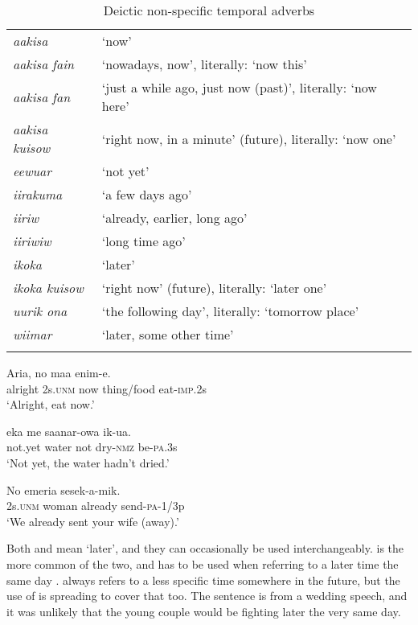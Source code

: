 \begin{table}
\caption{Deictic non-specific temporal adverbs}
\label{tab:3:deicticnonspecifictemporals}

\begin{tabular}{>{\itshape}ll}
\mytoprule
aakisa &`now'\\
aakisa fain &`nowadays, now', literally: `now this'\\
aakisa fan &`just a while ago, just now (past)', literally: `now here'\\
aakisa kuisow &`right now, in a minute' (future), literally: `now one'\\
eewuar &`not yet'\\
iirakuma &`a few days ago'\\
iiriw &`already, earlier, long ago'\\
iiriwiw &`long time ago'\\
ikoka &`later'\\
ikoka kuisow &`right now' (future), literally: `later one'\\
uurik ona &`the following day', literally: `tomorrow place'\\
wiimar &`later, some other time'\\
\mybottomrule 
\end{tabular}

\end{table}

\ea%
\label{ex:3:x473}
\gll Aria, no  maa enim-e. \\
alright 2s.\textsc{unm} now thing/food eat-\textsc{imp}.2s\\
\glt`Alright, eat now.'
\z

\ea%
\label{ex:3:x1215}
\gll {}  eka me saanar-owa ik-ua. \\
not.yet water not dry-\textsc{nmz} be-\textsc{pa}.3s\\
\glt`Not yet, the water hadn't dried.'
\z

\ea%
\label{ex:3:x474}
\gll No emeria  sesek-a-mik. \\
2s.\textsc{unm} woman already send-\textsc{pa}-1/3p\\
\glt`We already sent your wife (away).'
\z

Both  and  mean `later', and they can occasionally be used interchangeably.  is the more common of the two, and has to be used when referring to a later time the same day .  always refers to a less specific time somewhere in the future, but the use of  is spreading to cover that too. The sentence  is from a wedding speech, and it was unlikely that the young couple would be fighting later the very same day.

